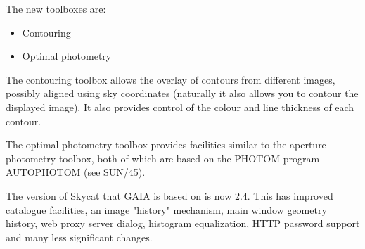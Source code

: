 \documentclass[twoside,11pt]{article}
\newcommand{\xref}[3]{#1}
\renewcommand{\_}{\texttt{\symbol{95}}}
\begin{document}
  The new toolboxes are:
  \begin{itemize}
     \item Contouring
     \item Optimal photometry
  \end{itemize}

  The contouring toolbox allows the overlay of contours from different
  images, possibly aligned using sky coordinates (naturally it also
  allows you to contour the displayed image). It also provides control
  of the colour and line thickness of each contour.

  The optimal photometry toolbox provides facilities similar to the
  aperture photometry toolbox, both of which are based on the PHOTOM
  program AUTOPHOTOM (see \xref{SUN/45}{sun45}{}).

  The version of Skycat that GAIA is based on is now 2.4. This has
  improved catalogue facilities, an image "history" mechanism, main
  window geometry history, web proxy server dialog, histogram
  equalization, HTTP password support and many less significant changes.
\end{document}
